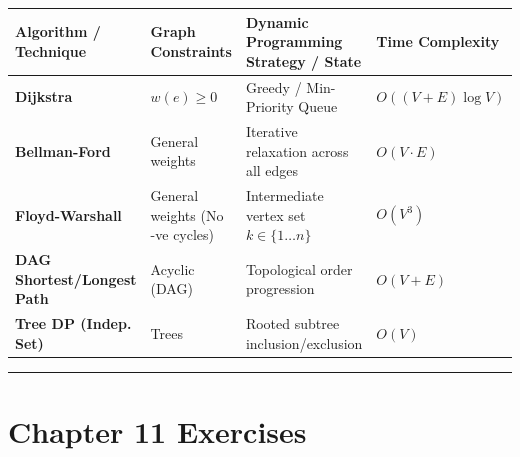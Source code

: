\documentclass[
]{book}
\newcounter{none} %
\theoremstyle{definition}
\theoremstyle{definition}
\theoremstyle{definition}
\theoremstyle{definition}
\theoremstyle{remark}
\begin{document}
{\def\LTcaptype{none} %
\begin{longtable}[]{@{}
  >{\raggedright\arraybackslash}p{}
  >{\raggedright\arraybackslash}p{}
  >{\raggedright\arraybackslash}p{}
  >{\raggedright\arraybackslash}p{}@{}}
\toprule\noalign{}
\begin{minipage}[b]{\linewidth}\raggedright
Algorithm / Technique
\end{minipage} & \begin{minipage}[b]{\linewidth}\raggedright
Graph Constraints
\end{minipage} & \begin{minipage}[b]{\linewidth}\raggedright
Dynamic Programming Strategy / State
\end{minipage} & \begin{minipage}[b]{\linewidth}\raggedright
Time Complexity
\end{minipage} \\
\midrule\noalign{}
\endhead
\bottomrule\noalign{}
\endlastfoot
\textbf{Dijkstra} & \(w(e) \ge 0\) & Greedy / Min-Priority Queue & \(O((V+E)\log V)\) \\
\textbf{Bellman-Ford} & General weights & Iterative relaxation across all edges & \(O(V \cdot E)\) \\
\textbf{Floyd-Warshall} & General weights (No -ve cycles) & Intermediate vertex set \(k \in \{1 \dots n\}\) & \(O(V^3)\) \\
\textbf{DAG Shortest/Longest Path} & Acyclic (DAG) & Topological order progression & \(O(V + E)\) \\
\textbf{Tree DP (Indep. Set)} & Trees & Rooted subtree inclusion/exclusion & \(O(V)\) \\
\end{longtable}
}

\begin{center}\rule{0.5\linewidth}{0.5pt}\end{center}

\section{Chapter 11 Exercises}\label{chapter-11-exercises}
\end{document}
